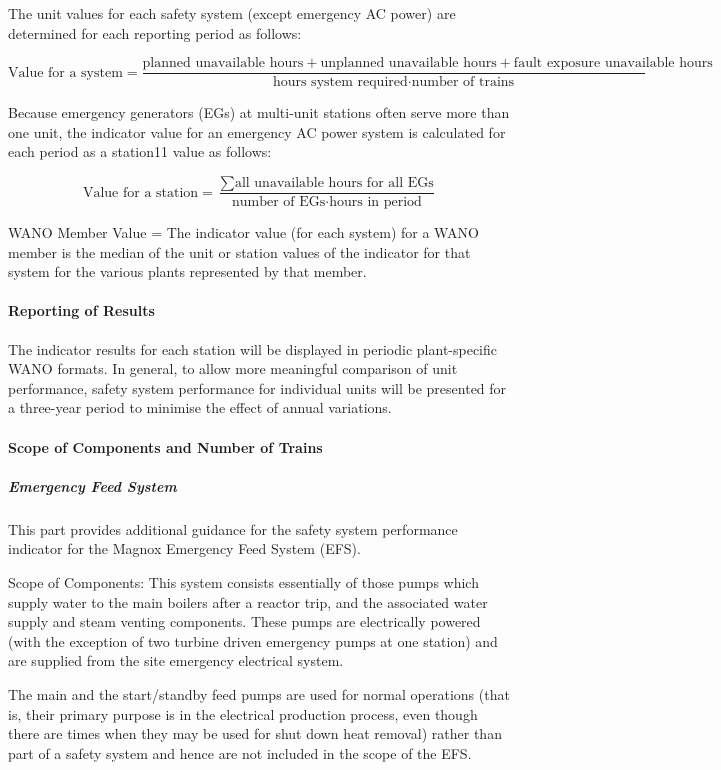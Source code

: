 The unit values for each safety system (except emergency AC power) are
determined for each reporting period as follows:

$$ \text{Value for a system} =
\frac{\text{planned unavailable hours}+\text{unplanned unavailable hours}+\text{fault
exposure unavailable hours}}{\text{hours system required} \cdot \text{number of
trains}} $$

Because emergency generators (EGs) at multi-unit stations often serve
more than one unit, the indicator value for an emergency AC power
system is calculated for each period as a station11 value as follows:

$$ \text{Value for a station} = \frac{\sum{\text{all unavailable hours for all
EGs}}}{\text{number of EGs} \cdot \text{hours in period}} $$

WANO Member Value = The indicator value (for each system) for a WANO
member is the median of the unit or station values of the indicator
for that system for the various plants represented by that member.

\paragraph{Reporting of Results}

The indicator results for each station will be displayed in periodic plant-specific WANO formats.
In general, to allow more meaningful comparison of unit performance,
safety system performance for individual units will be presented for a
three-year period to minimise the effect of annual variations.

\paragraph{Scope of Components and Number of Trains}

\subparagraph{Emergency Feed System}

This part provides additional guidance for the safety system
performance indicator for the Magnox Emergency Feed System (EFS).

Scope of Components:  This system consists essentially of those pumps
which supply water to the main boilers after a reactor trip, and the
associated water supply and steam venting components. These pumps are
electrically powered (with the exception of two turbine driven
emergency pumps at one station) and are supplied from the site
emergency electrical system.

The main and the start/standby feed pumps are used for normal
operations (that is, their primary purpose is in the electrical
production process, even though there are times when they may be used
for shut down heat removal) rather than part of a safety system and
hence are not included in the scope of the EFS.

